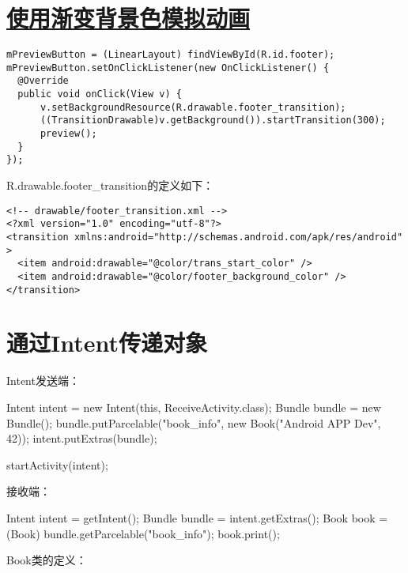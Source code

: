 \section[使用渐变背景色模拟动画]{\underline{使用渐变背景色模拟动画}}
\begin{verbatim}
mPreviewButton = (LinearLayout) findViewById(R.id.footer);
mPreviewButton.setOnClickListener(new OnClickListener() {
  @Override
  public void onClick(View v) {
      v.setBackgroundResource(R.drawable.footer_transition);
      ((TransitionDrawable)v.getBackground()).startTransition(300);
      preview();
  }
});
\end{verbatim}

R.drawable.footer\_transition的定义如下：

\begin{verbatim}
<!-- drawable/footer_transition.xml -->
<?xml version="1.0" encoding="utf-8"?>
<transition xmlns:android="http://schemas.android.com/apk/res/android" >
  <item android:drawable="@color/trans_start_color" />
  <item android:drawable="@color/footer_background_color" />
</transition>
\end{verbatim}


\section[通过Intent传递对象]{通过Intent传递对象}
Intent发送端：\par
\begin{javacode}
Intent intent = new Intent(this, ReceiveActivity.class);
Bundle bundle = new Bundle();
bundle.putParcelable("book_info", new Book("Android APP Dev", 42));
intent.putExtras(bundle);

startActivity(intent);
\end{javacode}

接收端：\par
\begin{javacode}
Intent intent = getIntent();
Bundle bundle = intent.getExtras();
Book book = (Book) bundle.getParcelable("book_info");
book.print();
\end{javacode}

Book类的定义：\par
\inputminted[linenos,tabsize=4,bgcolor=srcbg]{java}{srcdir/ParcableBook.java}
